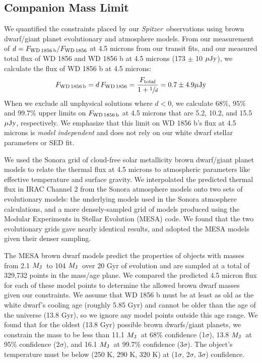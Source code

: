 \documentclass{nature3}
\newcommand{\mjup}{\ensuremath{M_{\rm J}}}
\newcommand{\microjanskys}{\ensuremath{\mathbf{{\rm \mu Jy}}}}
\newcommand{\project}[1]{\textsl{#1}}
\newcommand{\Spitzer}{\project{Spitzer}}
\begin{document}
\begin{methods}
\subsection{Companion Mass Limit}
We quantified the constraints placed by our \Spitzer\ observations using brown dwarf/giant planet evolutionary and atmosphere models. From our measurement of $d = F_{\rm WD\,1856\,b}/F_{\rm WD\,1856}$ at 4.5 microns from our transit fits, and our measured total flux of WD 1856 and WD 1856 b at 4.5 microns (173 $\pm$ 10 \microjanskys), we calculate the flux of WD 1856 b at 4.5 microns:
\begin{equation}
    F_{\rm WD\,1856\,b} = d\,F_{\rm WD\,1856} = \frac{F_{\rm total}}{1+\sfrac{1}{d}} = 0.7 \pm 4.9 \microjanskys
\end{equation}
When we exclude all unphysical solutions where $d < 0$, we calculate 68\%, 95\% and 99.7\% upper limits on $F_{\rm WD\,1856\,b}$ at 4.5 microns that are 5.2, 10.2, and 15.5 \microjanskys, respectively. We emphasize that this limit on WD 1856 b's flux at 4.5 microns is \textit{model independent} and does not rely on our white dwarf stellar parameters or SED fit. 


We used the Sonora grid\cite{sonora} of cloud-free solar metallicity brown dwarf/giant planet models to relate the thermal flux at 4.5 microns to atmospheric parameters like effective temperature and surface gravity. We interpolated the predicted thermal flux in IRAC Channel 2 from the Sonora atmosphere models onto two sets of evolutionary models: the underlying models used in the Sonora atmosphere calculations, and a more densely-sampled grid of models\cite{nelson2018} produced using the Modular Experiments in Stellar Evolution (MESA) code. We found that the two evolutionary grids gave nearly identical results, and adopted the MESA models given their denser sampling. 

The MESA brown dwarf models predict the properties of objects with masses from 2.1 \mjup\ to 104 \mjup\ over 20 Gyr of evolution and are sampled at a total of 329,732 points in the mass/age plane. We compared the predicted 4.5 micron flux for each of these model points to determine the allowed brown dwarf masses given our constraints. We assume that WD 1856 b must be at least as old as the white dwarf's cooling age (roughly 5.85 Gyr) and cannot be older than the age of the universe (13.8 Gyr), so we ignore any model points outside this age range. We found that for the oldest (13.8 Gyr) possible brown dwarfs/giant planets, we constrain the mass to be less than 11.1 \mjup\ at 68\% confidence (1$\sigma$), 13.8 \mjup\ at 95\% confidence (2$\sigma$), and 16.1 \mjup\ at 99.7\% confidence (3$\sigma$). The object's temperature must be below (250 K, 290 K, 320 K) at (1$\sigma$, 2$\sigma$, 3$\sigma$) confidence. 


\end{methods}
\end{document}
